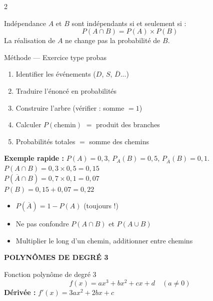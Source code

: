 \documentclass[a4paper,10pt]{article}
\begin{document}
\begin{multicols}{2}
\begin{defbox}{Indépendance}
$A$ et $B$ sont indépendants si et seulement si :
$$P(A \cap B) = P(A) \times P(B)$$
La réalisation de $A$ ne change pas la probabilité de $B$.
\end{defbox}

\begin{methbox}{Méthode — Exercice type probas}
\begin{enumerate}[nosep,leftmargin=12pt]
  \item Identifier les événements ($D$, $S$, $\overline{D}$...)
  \item Traduire l'énoncé en probabilités
  \item Construire l'arbre (vérifier : somme $= 1$)
  \item Calculer $P(\text{chemin})$ $=$ produit des branches
  \item Probabilités totales $=$ somme des chemins
\end{enumerate}
\end{methbox}

\begin{exbox}
\textbf{Exemple rapide :} $P(A) = 0{,}3$, $P_A(B) = 0{,}5$, $P_{\overline{A}}(B) = 0{,}1$.\\
$P(A \cap B) = 0{,}3 \times 0{,}5 = 0{,}15$\\
$P(\overline{A} \cap B) = 0{,}7 \times 0{,}1 = 0{,}07$\\
$P(B) = 0{,}15 + 0{,}07 = 0{,}22$
\end{exbox}

\begin{attbox}
\begin{itemize}[nosep,leftmargin=12pt]
  \item $P(\overline{A}) = 1 - P(A)$ (toujours !)
  \item Ne pas confondre $P(A \cap B)$ et $P(A \cup B)$
  \item Multiplier le long d'un chemin, additionner entre chemins
\end{itemize}
\end{attbox}

\columnbreak

{\large\bfseries\color{bleupro} POLYNÔMES DE DEGRÉ 3}
\vspace{4pt}

\begin{defbox}{Fonction polynôme de degré 3}
$$f(x) = ax^3 + bx^2 + cx + d \quad (a \neq 0)$$
\textbf{Dérivée :} $f'(x) = 3ax^2 + 2bx + c$
\end{defbox}


\end{multicols}
\end{document}
